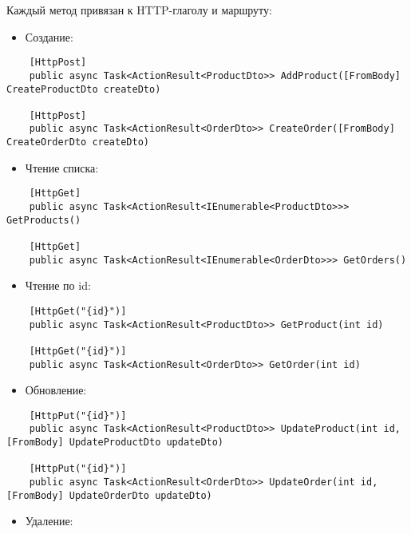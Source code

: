 \documentclass[a4paper,12pt]{report}
\begin{document}
Каждый метод привязан к \acs{HTTP}-глаголу и маршруту:
\begin{itemize}
    \item Создание:
\end{itemize}

\begin{verbatim}
    [HttpPost]
    public async Task<ActionResult<ProductDto>> AddProduct([FromBody] CreateProductDto createDto)

    [HttpPost]
    public async Task<ActionResult<OrderDto>> CreateOrder([FromBody] CreateOrderDto createDto)
\end{verbatim}

\begin{itemize}
    \item Чтение списка:
\end{itemize}

\begin{verbatim}
    [HttpGet]
    public async Task<ActionResult<IEnumerable<ProductDto>>> GetProducts()

    [HttpGet]
    public async Task<ActionResult<IEnumerable<OrderDto>>> GetOrders()
\end{verbatim}

\begin{itemize}
    \item Чтение по id:
\end{itemize}

\begin{verbatim}
    [HttpGet("{id}")]
    public async Task<ActionResult<ProductDto>> GetProduct(int id)

    [HttpGet("{id}")]
    public async Task<ActionResult<OrderDto>> GetOrder(int id) 
\end{verbatim}

\begin{itemize}
    \item Обновление:
\end{itemize}

\begin{verbatim}
    [HttpPut("{id}")]
    public async Task<ActionResult<ProductDto>> UpdateProduct(int id, [FromBody] UpdateProductDto updateDto)
    
    [HttpPut("{id}")]
    public async Task<ActionResult<OrderDto>> UpdateOrder(int id, [FromBody] UpdateOrderDto updateDto)
\end{verbatim}

\begin{itemize}
    \item Удаление:
\end{itemize}
    
\end{document}
